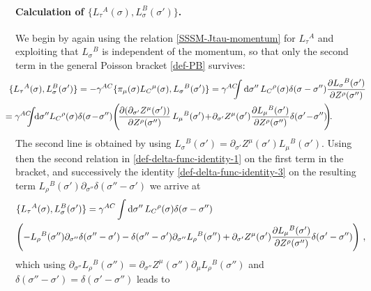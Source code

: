 \documentclass[12pt]{article}
\numberwithin{equation}{section}
\begin{document}
\paragraph{Calculation of $\{ L_{\tau}{}^{A}(\sigma),L_{\sigma}^{B}(\sigma') \}$.} We begin by again using the relation \eqref{SSSM-Jtau-momentum} for $L_{\tau}{}^{A}$ and exploiting that $L_{\sigma}{}^{B}$ is independent of the momentum, so that only the second term in the general Poisson bracket \eqref{def-PB} survives:
\begin{align}\label{SSSM-Jtau-Jsigma-bracket-first-step}
&\!\!\!\!\!\{ L_{\tau}{}^{A}(\sigma),L_{\sigma}^{B}(\sigma') \} = -\gamma^{AC} \{ \pi_{\mu}(\sigma)L_{C}{}^{\mu}(\sigma),L_{\sigma}{}^{B}(\sigma') \}=\gamma^{AC}\!\!\!\!\int \mathrm{d}\sigma'' \, L_{C}{}^{\rho}(\sigma)\delta(\sigma-\sigma'') \frac{\partial L_{\sigma}{}^{B}(\sigma')}{\partial Z^{\rho}(\sigma'')}
\notag \\
&\hspace{-15pt} = \gamma^{AC}\!\!\!\! \int \!\! \mathrm{d}\sigma'' L_{C}{}^{\rho}(\sigma)\delta(\sigma \!-\!\sigma'') \Biggl( \!\frac{\partial (\partial_{\sigma'} Z^{\mu}(\sigma'))}{\partial Z^{\rho}(\sigma'')} \, L_{\mu}{}^{B}(\sigma')\!+\!\partial_{\sigma'}Z^{\mu}(\sigma')\frac{\partial L_{\mu}{}^{B}(\sigma')}{\partial Z^{\rho}(\sigma'')}\delta(\sigma'\!-\!\sigma'') \!\!\Biggr) \! .
\end{align}
The second line is obtained by using $L_{\sigma}{}^{B}(\sigma')=\partial_{\sigma'}Z^{\mu}(\sigma') L_{\mu}{}^{B}(\sigma')$. Using then the second relation in \eqref{def-delta-func-identity-1} on the first term in the bracket, and successively the identity \eqref{def-delta-func-identity-3} on the resulting term $L_{\rho}{}^{B}(\sigma')\partial_{\sigma''} \delta(\sigma''-\sigma')$ we arrive at
\begin{align}
&\{ L_{\tau}{}^{A}(\sigma),L_{\sigma}^{B}(\sigma') \} =\gamma^{AC}\int \mathrm{d}\sigma'' \, L_{C}{}^{\rho}(\sigma)\delta(\sigma-\sigma'')
\\
& \Biggl( -L_{\rho}{}^{B}(\sigma'')\partial_{\sigma''}\delta(\sigma''-\sigma')-\delta(\sigma''-\sigma')\partial_{\sigma''}L_{\rho}{}^{B}(\sigma'')+\partial_{\sigma'}Z^{\mu}(\sigma')\frac{\partial L_{\mu}{}^{B}(\sigma')}{\partial Z^{\rho}(\sigma'')}\delta(\sigma'-\sigma'') \Biggr) \,\, ,
\notag
\end{align}
which using $\partial_{\sigma''}L_{\rho}{}^{B}(\sigma'')=\partial_{\sigma''}Z^{\mu}(\sigma'')\partial_{\mu}L_{\rho}{}^{B}(\sigma'')$ and $\delta(\sigma''-\sigma')=\delta(\sigma'-\sigma'')$ leads to
\end{document}
